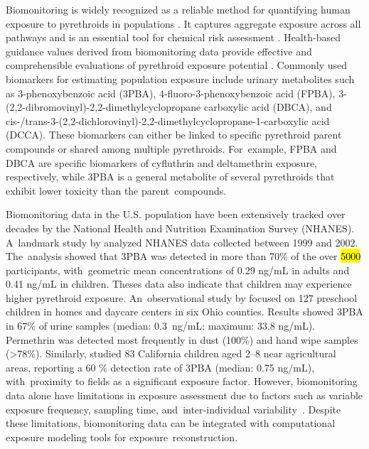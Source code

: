 \documentclass[toxics,article,accept,pdftex,moreauthors]{Definitions/mdpi}
\begin{document}
Biomonitoring is widely recognized as a reliable method for quantifying
human exposure to pyrethroids in populations
\citep{barr2010urinary, quindroit2021estimating, tarazona2022tiered}. It
captures aggregate exposure across all pathways and is an essential tool
for chemical risk assessment
\citep{blount2007perchlorate, sobus2015uses}. Health-based guidance
values derived from biomonitoring data provide effective and
comprehensible evaluations of pyrethroid exposure potential
\citep{apel2023human}. Commonly used biomarkers for estimating population
exposure include urinary metabolites such as 3-phenoxybenzoic acid
(3PBA), 4-fluoro-3-phenoxybenzoic acid (FPBA),
3-(2,2-dibromovinyl)-2,2-dimethylcyclopropane carboxylic acid (DBCA),
and
cis-/trans-3-(2,2-dichlorovinyl)-2,2-dimethylcyclopropane-1-carboxylic
acid (DCCA). These biomarkers can either be linked to specific
pyrethroid parent compounds or shared among multiple pyrethroids. For~example, FPBA and DBCA are specific biomarkers of cyfluthrin and deltamethrin exposure,
respectively, while 3PBA is a general metabolite of several pyrethroids that
exhibit lower toxicity than the \mbox{parent~compounds.}

Biomonitoring data in the U.S. population have been extensively tracked over decades by the
National Health and Nutrition Examination Survey (NHANES). A~landmark study by \citet{barr2010urinary} analyzed NHANES data collected
between 1999 and 2002. The~analysis showed that 3PBA was detected in more than 70\% of the over \hl{5000} %
participants, with~geometric mean concentrations of 0.29 ng/mL in adults and
0.41 ng/mL in children. Theses data also indicate that children may experience higher
pyrethroid exposure. An~observational study by \citet{morgan2007observational}
focused on 127 preschool children in homes and daycare centers in six Ohio
counties. Results showed 3PBA in 67\% of urine samples (median: 0.3~ng/mL;
maximum: 33.8 ng/mL). Permethrin was detected most frequently in dust (100\%) and
hand wipe samples (>78\%). Similarly, \citet{trunnelle2014urinary} studied 83
California children aged 2--8 near agricultural areas, reporting a 60 \%
detection rate of 3PBA (median: 0.75 ng/mL), with~proximity to fields as a
significant exposure factor. However, biomonitoring data alone have limitations
in exposure assessment due to factors such as variable exposure frequency,
sampling time, and~inter-individual variability~\citep{aylward2017variation}.
Despite these limitations, biomonitoring data can be integrated with
computational exposure modeling tools for exposure~reconstruction.
\end{document}

